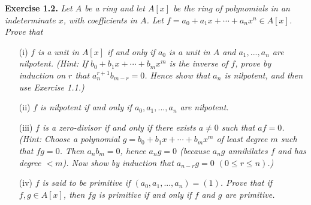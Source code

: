 \documentclass{article}
\begin{document}
\textbf{Exercise 1.2.}
\emph{Let $A$ be a ring and
let $A[x]$ be the ring of polynomials in an indeterminate $x$,
with coefficients in $A$.
Let $f = a_0 + a_1 x + \cdots + a_n x^n \in A[x]$.
Prove that}
\begin{enumerate}
\item[(i)]
\emph{$f$ is a unit in $A[x]$ if and only if
$a_0$ is a unit in $A$ and
$a_1, ..., a_n$ are nilpotent.
(Hint: If $b_0 + b_1 x + \cdots + b_m x^m$ is the inverse of $f$,
prove by induction on $r$ that $a_n^{r+1} b_{m-r} = 0$.
Hence show that $a_n$ is nilpotent, and then use Exercise 1.1.)}
\item[(ii)]
\emph{$f$ is nilpotent if and only if
$a_0, a_1, ..., a_n$ are nilpotent.}
\item[(iii)]
\emph{$f$ is a zero-divisor if and only if
there exists $a \neq 0$ such that $af = 0$.
(Hint: Choose a polynomial $g = b_0 + b_1 x + \cdots + b_m x^m$
of least degree $m$ such that $fg = 0$.
Then $a_n b_m = 0$, hence $a_n g = 0$
(because $a_n g$ annihilates $f$ and has degree $< m$).
Now show by induction that $a_{n-r}g = 0$ $(0 \leq r \leq n)$.)}
\item[(iv)]
\emph{$f$ is said to be primitive if $(a_0, a_1, ..., a_n) = (1)$.
Prove that if $f, g \in A[x]$, then $fg$ is primitive if and only if
$f$ and $g$ are primitive.} \\
\end{enumerate}
\end{document}
